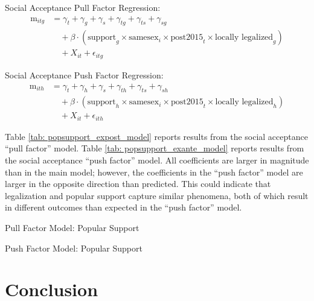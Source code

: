 \documentclass[12pt,letterpaper]{article}
\begin{document}
\hfill
\break
Social Acceptance Pull Factor Regression:
\begin{equation}
\begin{aligned}
\text{m}_{itg} &= \gamma_t + \gamma_g + \gamma_s + \gamma_{tg} + \gamma_{ts} + \gamma_{sg} \\
&\quad + \beta \cdot (\text{support}_g \times \text{samesex}_i \times \text{post2015}_t \times \text{locally legalized}_g) \\
&\quad + X_{it} + \epsilon_{itg}
\end{aligned}
\end{equation}

\hfill
\break
Social Acceptance Push Factor Regression:
\begin{equation}
\begin{aligned}
\text{m}_{ith} &= \gamma_t + \gamma_h + \gamma_s + \gamma_{th} + \gamma_{ts} + \gamma_{sh} \\
&\quad + \beta \cdot (\text{support}_h \times \text{samesex}_i \times \text{post2015}_t \times \text{locally legalized}_h) \\
&\quad + X_{it} + \epsilon_{ith}
\end{aligned}
\end{equation}

Table \ref{tab: popsupport_expost_model} reports results from the social acceptance “pull factor” model. Table \ref{tab: popsupport_exante_model} reports results from the social acceptance “push factor” model. All coefficients are larger in magnitude than in the main model; however, the coefficients in the “push factor” model are larger in the opposite direction than predicted. This could indicate that legalization and popular support capture similar phenomena, both of which result in different outcomes than expected in the “push factor” model.

\begin{table}[htbp] %
    \centering
    \caption{Pull Factor Model: Popular Support}
    \label{tab: popsupport_expost_model}
    
\end{table}
\begin{table}[htbp]
    \centering
    \caption{Push Factor Model: Popular Support}
    \label{tab: popsupport_exante_model}
    
\end{table}

\section{Conclusion}
\end{document}
